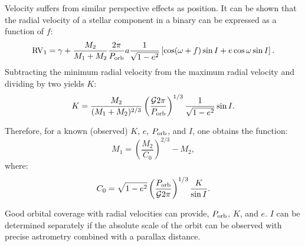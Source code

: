 \documentclass[12pt,preprint]{hackaastex}
\newcommand{\Porb}{\ifmmode {P_{\rm orb}}\else${P_{\rm orb}}$\fi}
\newcommand{\RV}{\ifmmode {{\rm RV}}\else RV \fi}
\newcommand{\bigG}{\ifmmode {\mathcal{G}}\else${\mathcal{G}}$\fi}
\begin{document}
Velocity suffers from similar perspective effects as position. It can be shown that the radial velocity of a stellar component in a binary can be expressed as a function of $f$:
\begin{equation}
\RV_1 = \gamma + \frac{M_2}{M_1 + M_2} \frac{2\pi}{\Porb} a \frac{1}{\sqrt{1-e^2}} \left[ \cos(\omega + f) \sin I + e \cos \omega \sin I \right]. 
\end{equation}
Subtracting the minimum radial velocity from the maximum radial velocity and dividing by two yields $K$:
\begin{equation}
K = \frac{M_2}{(M_1 + M_2)^{2/3}} \left( \frac{\bigG 2 \pi}{\Porb}\right)^{1/3} \frac{1}{\sqrt{1-e^2}} \sin I.
\end{equation}

Therefore, for a known (observed) $K$, $e$, \Porb, and $I$, one obtains the function:
\begin{equation}
M_1 = \left( \frac{M_2}{C_0} \right)^{2/3} - M_2,
\end{equation}
where:
\begin{equation}
C_0 = \sqrt{1-e^2} \left( \frac{\Porb}{\bigG 2 \pi}\right)^{1/3} \frac{K}{\sin I}.
\end{equation}

Good orbital coverage with radial velocities can provide, \Porb, $K$, and $e$. $I$ can be determined separately if the absolute scale of the orbit can be observed with precise astrometry combined with a parallax distance.


\clearpage


%
\end{document}
